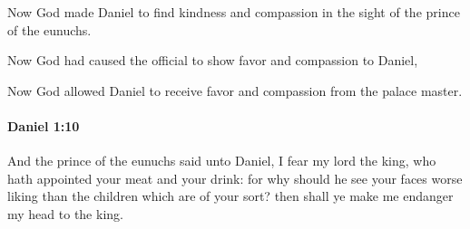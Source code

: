			\begin{versebox}
					\item[BHS] 
					\item[LXX] 
					\item[ASV] Now God made Daniel to find kindness and compassion in the sight of the prince of the eunuchs.
					\item[NIV] Now God had caused the official to show favor and compassion to Daniel,
					\item[NRSV] Now God allowed Daniel to receive favor and compassion from the palace master.
			\end{versebox}

		\paragraph{Daniel 1:10} %
			\label{DANIEL-1-10}

			And the prince of the eunuchs said unto Daniel, I fear my lord the king, who hath appointed your meat and your drink: for why should he see your faces worse liking than the children which are of your sort? then shall ye make me endanger my head to the king.

